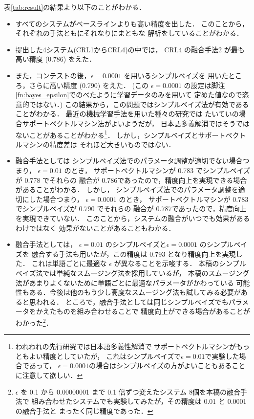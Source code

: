 表\ref{tab:result}の結果より以下のことがわかる．
\begin{itemize}
\item 
  すべてのシステムがベースラインよりも高い精度を出した．
  このことから，それぞれの手法ともにそれなりにまともな
  解析をしていることがわかる．

\item 
  提出した4システム(CRL1からCRL4)の中では，
  CRL4 の融合手法2 が最も高い精度 (0.786) をえた．

\item 
  また，コンテストの後，$\epsilon=0.0001$ を用いるシンプルベイズを
  用いたところ，さらに高い精度 (0.790) をえた．
  (この $\epsilon=0.0001$ の設定は脚注\ref{fn:bayes_epsilon}でのべたように学習データのみを用いて
  定めた値なので恣意的ではない．)
  この結果から，この問題ではシンプルベイズ法が有効であることがわかる．
  最近の機械学習手法を用いた種々の研究\cite{taira_svm,kudoh_chunk_nl2000,murata_nlc2001}では
  たいていの場合サポートベクトルマシン法がよいようだが，
  日本語多義解消ではそうではないことがあることがわかる\footnote{われわれの先行研究\cite{murata_nlc2001_wsd}では日本語多義性解消で
    サポートベクトルマシンがもっともよい精度としていたが，
    これはシンプルベイズで$\epsilon=0.01$で実験した場合であって，
    $\epsilon=0.0001$の場合はシンプルベイズの方がよいこともあることに注意して欲しい．}．
  しかし，シンプルベイズとサポートベクトルマシンの精度差は
  それほど大きいものではない．

\item 
  融合手法としては
  シンプルベイズ法でのパラメータ調整が適切でない場合つまり，
  $\epsilon=0.01$ のとき，
  サポートベクトルマシンが 0.783 でシンプルベイズが 0.778 でそれらの
  融合が 0.786であったので，精度向上を実現できる場合があることがわかる．
  しかし，
  シンプルベイズ法でのパラメータ調整を適切にした場合つまり，
  $\epsilon=0.0001$ のとき，
  サポートベクトルマシンが 0.783 でシンプルベイズが 0.790 でそれらの
  融合が 0.787であったので，精度向上を実現できていない．
  このことから，システムの融合がいつでも効果があるわけではなく
  効果がないことがあることもわかる．

\item 
  融合手法としては，
  $\epsilon=0.01$ のシンプルベイズと$\epsilon=0.0001$ のシンプルベイズを
  融合する手法も用いたが，この精度は 0.793 となり精度向上を実現した．
  これは単語ごとに最適な $\epsilon$ が異なることを示唆する．
  本稿のシンプルベイズ法では単純なスムージング法を採用しているが，
  本稿のスムージング法があまりよくないために単語ごとに最適なパラメータがかわっている
  可能性もある．今後は他のもう少し高度なスムージング法も試してみる必要があると思われる．
  ところで，融合手法としては同じシンプルベイズでもパラメータをかえたものを組み合わせることで
  精度向上ができる場合があることがわかった\footnote{$\epsilon$ を
    0.1 から 0.00000001 まで 0.1 倍ずつ変えたシステム 8個を本稿の融合手法で
    組み合わせたシステムでも実験してみたが，その精度は 0.01 と 0.0001 の融合手法と
    まったく同じ精度であった．}．

\end{itemize}

